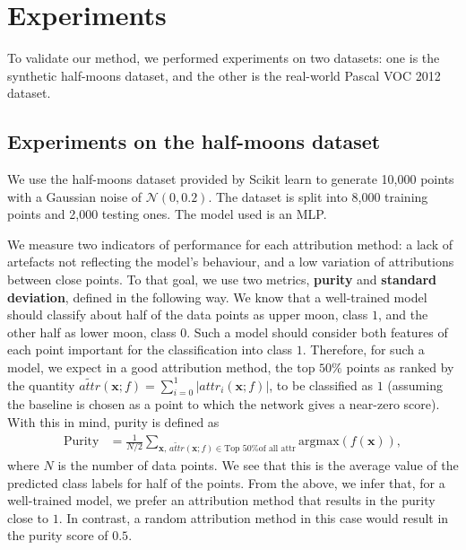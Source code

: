 \section{Experiments}
\label{sec:experiments}

To validate our method, we performed experiments on two datasets: one is the synthetic half-moons dataset, and the other is the real-world Pascal VOC 2012 dataset.

\subsection{Experiments on the half-moons dataset}
\label{subsec:half-moons}

We use the half-moons dataset provided by Scikit learn \citep{scikit-learn} to generate 10,000 points with a Gaussian noise of $\mathcal{N}(0, 0.2)$. The dataset is split into 8,000 training points and 2,000 testing ones. The model used is an MLP.

We measure two indicators of performance for each attribution method: a lack of artefacts not reflecting the model's behaviour, and a low variation of attributions between close points. To that goal, we use two metrics, \textbf{purity} and \textbf{standard deviation}, defined in the following way. We know that a well-trained model should classify about half of the data points as upper moon, class $1$, and the other half as lower moon, class $0$. Such a model should consider both features of each point important for the classification into class $1$. Therefore, for such a model, we expect in a good attribution method, the top $50\%$ points as ranked by the quantity $\widetilde{attr}(\textbf{x}; f) = \sum_{i=0}^1 |attr_i(\textbf{x}; f)|$, to be classified as $1$ (assuming the baseline is chosen as a point to which the network gives a near-zero score). With this in mind, purity is defined as
\begin{equation}
\begin{split}
    \textrm{Purity} &= \frac{1}{N/2}\sum_{\textbf{x}, \, \widetilde{attr}(\textbf{x}; f) \in \textrm{Top 50\% of all attr}} \textrm{argmax}(f(\textbf{x})),
\end{split}
\label{eq:moons-purity}
\end{equation}
where $N$ is the number of data points. We see that this is the average value of the predicted class labels for half of the points. From the above, we infer that, for a well-trained model, we prefer an attribution method that results in the purity close to $1$. In contrast, a random attribution method in this case would result in the purity score of $0.5$. 

